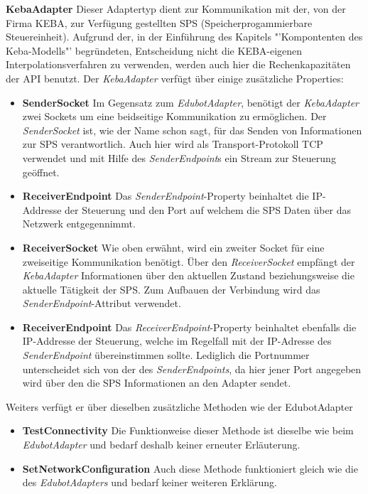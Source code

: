 \textbf{KebaAdapter}
\newline
Dieser Adaptertyp dient zur Kommunikation mit der, von der Firma KEBA, zur Verfügung gestellten SPS (Speicherprogammierbare Steuereinheit). Aufgrund der, in der Einführung des Kapitels "'Kompontenten des Keba-Modells"' begründeten, Entscheidung nicht die KEBA-eigenen Interpolationsverfahren zu verwenden, werden auch hier die Rechenkapazitäten der API benutzt. 
Der \textit{KebaAdapter} verfügt über einige zusätzliche Properties:
\begin{itemize}
\item \textbf{SenderSocket}
\newline
Im Gegensatz zum \textit{EdubotAdapter}, benötigt der \textit{KebaAdapter} zwei Sockets um eine beidseitige Kommunikation zu ermöglichen. Der \textit{SenderSocket} ist, wie der Name schon sagt, für das Senden von Informationen zur SPS verantwortlich. Auch hier wird als Transport-Protokoll TCP verwendet und mit Hilfe des \textit{SenderEndpoint}s ein Stream zur Steuerung geöffnet. 
\item \textbf{ReceiverEndpoint}
\newline
Das \textit{SenderEndpoint}-Property beinhaltet die IP-Addresse der Steuerung und den Port auf welchem die SPS Daten über das Netzwerk entgegennimmt. 
\item \textbf{ReceiverSocket}
\newline
Wie oben erwähnt, wird ein zweiter Socket für eine zweiseitige Kommunikation benötigt. Über den \textit{ReceiverSocket} empfängt der \textit{KebaAdapter} Informationen über den aktuellen Zustand beziehungsweise die aktuelle Tätigkeit der SPS. Zum Aufbauen der Verbindung wird das \textit{SenderEndpoint}-Attribut verwendet.
\item \textbf{ReceiverEndpoint}
\newline
Das \textit{ReceiverEndpoint}-Property beinhaltet ebenfalls die IP-Addresse der Steuerung, welche im Regelfall mit der IP-Adresse des \textit{SenderEndpoint} übereinstimmen sollte. Lediglich die Portnummer unterscheidet sich von der des \textit{SenderEndpoints}, da hier jener Port angegeben wird über den die SPS Informationen an den Adapter sendet.
\end{itemize}

Weiters verfügt er über dieselben zusätzliche Methoden wie der EdubotAdapter
\begin{itemize}
\item \textbf{TestConnectivity}
\newline
Die Funktionweise dieser Methode ist dieselbe wie beim \textit{EdubotAdapter} und bedarf deshalb keiner erneuter Erläuterung.
\item \textbf{SetNetworkConfiguration}
\newline
Auch diese Methode funktioniert gleich wie die des \textit{EdubotAdapters} und bedarf keiner weiteren Erklärung.
\end{itemize}

